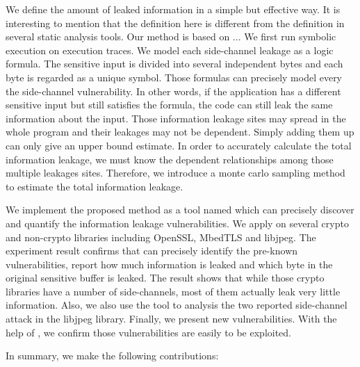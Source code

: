 We define the amount of leaked information in a simple but effective way. It is interesting to 
mention that the definition here is different from the definition in several static analysis 
tools.
Our method is based on ... 
We first run symbolic 
execution on execution traces. We model each side-channel leakage as a logic formula. 
The sensitive input is divided into several independent bytes and each byte is regarded as 
a unique symbol. Those formulas can precisely model every the side-channel vulnerability. 
In other words, if the application has a different sensitive input but still satisfies the formula, 
the code can still leak the same information about the input.  
Those information leakage sites may spread in the whole program 
and their leakages may not be dependent. Simply adding them up can only give an upper bound 
estimate. In order to accurately calculate the total information leakage, we must know the 
dependent relationships among those multiple leakages sites. Therefore, we introduce a 
monte carlo sampling method to estimate the total information leakage.

We implement the proposed method as a tool named \tool{} which can precisely discover and quantify the information
leakage vulnerabilities. We apply \tool{} on several crypto and non-crypto libraries including OpenSSL,
MbedTLS and libjpeg. The experiment result confirms that \tool{} can precisely identify the pre-known vulnerabilities,
report how much information is leaked and which byte in the original sensitive buffer is leaked. 
The result shows that while those crypto libraries have a number of side-channels, most of them actually
leak very little information. Also, we also use the tool to analysis the two reported side-channel attack 
in the libjpeg library. Finally, we present new vulnerabilities. With the help of \tool{}, we confirm those
vulnerabilities are easily to be exploited.

In summary, we make the following contributions:


